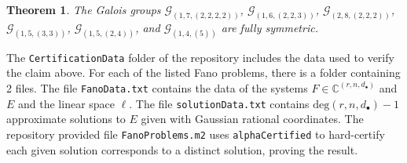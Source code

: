 \documentclass[12pt]{amsart}
\newtheorem{theorem}{Theorem}
\theoremstyle{definition}
\newcommand{\gal}{\mathcal{G}}
\begin{document}
\begin{theorem}
The Galois groups $\gal_{(1,7,(2,2,2,2))}$, $\gal_{(1,6,(2,2,3))}$, $\gal_{(2,8,(2,2,2))}$, $\gal_{(1,5,(3,3))}$, $\gal_{(1,5,(2,4))}$, and $\gal_{(1,4,(5))}$ are fully symmetric.
\end{theorem}

The \texttt{CertificationData} folder of the repository \cite{GithubRepo} includes the data used to verify the claim above. For each of the listed Fano problems, there is a folder containing 2 files. The file \texttt{FanoData.txt} contains the data of the systems $F\in\mathbb{C}^{(r,n,d_\bullet)}$ and $E$ and the linear space $\ell$. The file \texttt{solutionData.txt} contains $\text{deg}(r,n,d_\bullet)-1$ approximate solutions to $E$ given with Gaussian rational coordinates. The repository provided file \texttt{FanoProblems.m2} uses \texttt{alphaCertified} to hard-certify each given solution corresponds to a distinct solution, proving the result.





\end{document}
